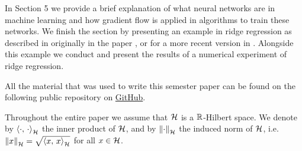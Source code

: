 In Section 5 we provide a brief explanation of what neural networks
are in machine learning and how gradient flow is applied in
algorithms to train these networks. We finish the section by
presenting an example in ridge regression 
as described in originally in the paper \cite{hoerl1970ridge}, 
or for a more recent version in \cite{signoretto2014learning}.
Alongside this example we conduct and present the results
of a numerical experiment of ridge regression.\medskip

All the material that was used to write this semester
paper can be found on the following public repository
on
\href{https://github.com/JethroWarnettMath/Semester-Project-Gradient-Flow-HS2021}
{GitHub}.\medskip

Throughout the entire paper we assume that $ \mathcal{H} $ is a $ \mathbb{R} $-Hilbert space. 
We denote by $ \left\langle \cdot,\,\cdot\right\rangle_{\mathcal{H}} $ the inner product of $ \mathcal{H} $, 
and by $ \left\Vert \cdot\right\Vert_{\mathcal{H}} $ the induced norm of $ \mathcal{H} $, i.e. $ \left\Vert x\right\Vert_{\mathcal{H}}=\sqrt{\left\langle x,\,x\right\rangle_{\mathcal{H}}} $
for all $ x\in\mathcal{H} $.